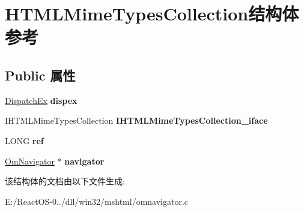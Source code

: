\hypertarget{struct_h_t_m_l_mime_types_collection}{}\section{H\+T\+M\+L\+Mime\+Types\+Collection结构体 参考}
\label{struct_h_t_m_l_mime_types_collection}
\subsection*{Public 属性}
\begin{DoxyCompactItemize}
\item 
\mbox{\label{struct_h_t_m_l_mime_types_collection_a060eb427109cc7717084da34de788a05}} 
\hyperlink{struct_dispatch_ex}{Dispatch\+Ex} {\bfseries dispex}
\item 
\mbox{\label{struct_h_t_m_l_mime_types_collection_a2577372f7f97fc622e3aeb662cce0cd9}} 
I\+H\+T\+M\+L\+Mime\+Types\+Collection {\bfseries I\+H\+T\+M\+L\+Mime\+Types\+Collection\+\_\+iface}
\item 
\mbox{\label{struct_h_t_m_l_mime_types_collection_affbfdd7cd6142873a4eba6981d55fdc8}} 
L\+O\+NG {\bfseries ref}
\item 
\mbox{\label{struct_h_t_m_l_mime_types_collection_ad3538eeb7818d568a0c2202d62235c61}} 
\hyperlink{struct_om_navigator}{Om\+Navigator} $\ast$ {\bfseries navigator}
\end{DoxyCompactItemize}


该结构体的文档由以下文件生成\+:\begin{DoxyCompactItemize}
\item 
E\+:/\+React\+O\+S-\/0../dll/win32/mshtml/omnavigator.\+c\end{DoxyCompactItemize}
